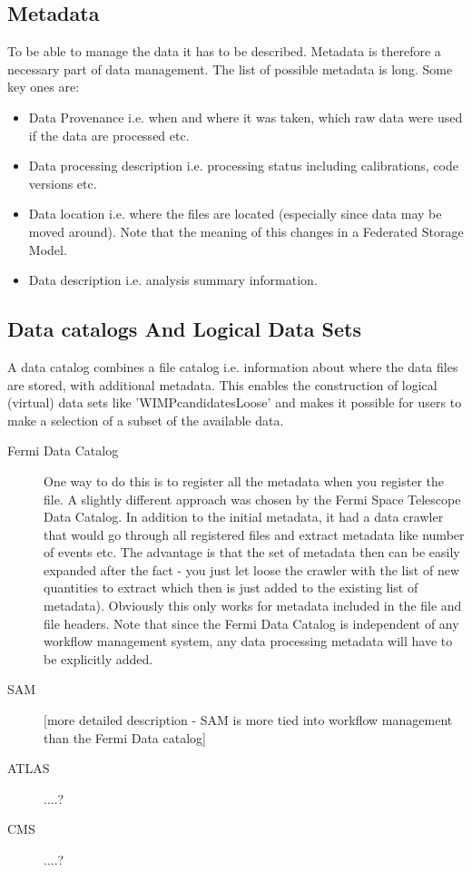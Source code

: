 \subsection{Metadata}
To be able to manage the data it has to be described. Metadata is therefore a necessary part of data management. The 
list of possible metadata is long. Some key ones are:

\begin{itemize}
\item Data Provenance i.e. when and where it was taken, which raw data were used if the data are processed etc.
\item Data processing description i.e. processing status including calibrations, code versions etc.
\item Data location i.e. where the files are located (especially since data may be moved around). Note that the meaning of this changes in a 
Federated Storage Model. 
\item Data description i.e. analysis summary information.
\end{itemize}



\subsection{Data catalogs And Logical Data Sets}
A data catalog combines a file catalog i.e. information about where the data files are stored, with additional metadata.
This enables the construction of logical (virtual) data sets like 'WIMPcandidatesLoose' and makes it possible for users to 
make a selection of a subset of the available data.

\begin{description}
\item[Fermi Data Catalog] One way to do this is to register all the metadata when you register the file. A slightly
different approach was chosen by the Fermi Space Telescope Data Catalog. In addition to the initial metadata, it had a
data crawler that would go through all registered files and extract metadata like number of events etc. The advantage is
that the set of metadata then can be easily expanded after the fact - you just let loose the crawler with the list
of new quantities to extract which then is just added to the existing list of metadata). Obviously this only works for 
metadata included in the file and file headers.  Note that since the Fermi 
Data Catalog is independent of any workflow management system, any data processing metadata will have to be explicitly added. 


\item[SAM] [more detailed description - SAM is more tied into workflow management than the Fermi Data catalog]

\item[ATLAS] ....?

\item[CMS] ....?

\end{description}



